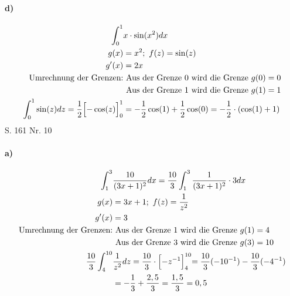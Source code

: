 \documentclass[12pt,a4paper]{report}
\begin{document}
	\paragraph{d)}
	\begin{align*}
		\int_{0}^{1} &x\cdot \sin(x^2)dx \\
		g(x) &= x^2;\ f(z) = \sin(z) \\
		g'(x) &= 2x \\
		\text{Umrechnung der Grenzen:}&\ \text{Aus der Grenze 0 wird die Grenze}\ g(0) = 0 \\
		&\ \text{Aus der Grenze 1 wird die Grenze}\ g(1) = 1 \\
		\int_{0}^{1} \sin(z) dz = \frac{1}{2} \Bigl[-\cos(z)\Bigl]_{0}^{1} &=-\frac{1}{2}\cos(1) + \frac{1}{2}\cos(0)=-\frac{1}{2} \cdot (\cos(1) + 1)
	\end{align*}
	\noindent
	\Large S. 161 Nr. 10
	\large
	\paragraph{a)}
	\begin{align*}
		\int_{1}^{3}& \frac{10}{(3x+1)^2} dx = \frac{10}{3} \int_{1}^{3} \frac{1}{(3x + 1)^2} \cdot 3 dx \\
		g(x) &= 3x + 1;\ f(z) = \frac{1}{z^2} \\
		g'(x) &= 3 \\
		\text{Umrechnung der Grenzen:}&\ \text{Aus der Grenze 1 wird die Grenze}\ g(1) = 4 \\
		&\ \text{Aus der Grenze 3 wird die Grenze}\ g(3) = 10  \\
		\frac{10}{3} \int_{4}^{10} & \frac{1}{z^2} dz = \frac{10}{3} \cdot \Bigl[-z^{-1}\Bigl]_{4}^{10} = \frac{10}{3} (-10^{-1}) - \frac{10}{3} (-4^{-1}) \\
		&= -\frac{1}{3} + \frac{2,5}{3} =\frac{1,5}{3} = 0,5
	\end{align*}
\end{document}
